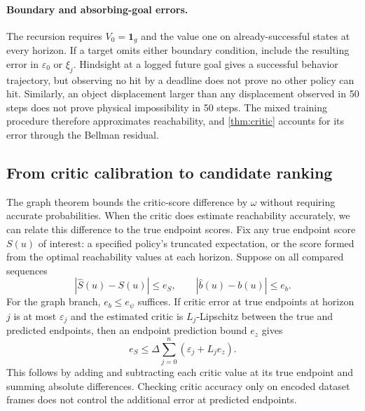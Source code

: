 \documentclass{article} %
\newcommand{\ind}{\mathbf{1}}
\theoremstyle{definition}
\theoremstyle{remark}
\begin{document}
\paragraph{Boundary and absorbing-goal errors.}
The recursion requires $V_0=\ind_g$ and the value one on already-successful states
at every horizon. If a target omits either boundary condition, include the resulting
error in $\varepsilon_0$ or $\xi_j$.
Hindsight at a logged future goal gives a successful behavior trajectory, but observing
no hit by a deadline does not prove no other policy can hit.
Similarly, an object displacement larger than any displacement observed in 50 steps
does not prove physical impossibility in 50 steps.
The mixed training procedure therefore approximates reachability, and
\cref{thm:critic} accounts for its error through the Bellman residual.

\subsection{From critic calibration to candidate ranking}
\label{app:calibration}
The graph theorem bounds the critic-score difference by $\omega$ without requiring
accurate probabilities. When the critic does estimate reachability accurately,
we can relate this difference to the true endpoint scores.
Fix any true endpoint score $S(u)$ of interest: a specified policy's truncated
expectation, or the score formed from the optimal reachability values at each horizon.
Suppose on all compared sequences
\begin{equation}
 |\widehat S(u)-S(u)|\le e_S,\qquad
 |\widehat b(u)-b(u)|\le e_b .
 \label{eq:score-uniform}
\end{equation}
For the graph branch, $e_b\le e_\psi$ suffices.
If critic error at true endpoints at horizon $j$ is at most $\varepsilon_j$ and
the estimated critic is $L_j$-Lipschitz between the true and predicted endpoints,
then an endpoint prediction bound $e_z$ gives
\begin{equation}
 e_S\le\Delta\sum_{j=0}^{n}(\varepsilon_j+L_je_z).
 \label{eq:score-model-calibration}
\end{equation}
This follows by adding and subtracting each critic value at its true
endpoint and summing absolute differences. Checking critic accuracy only on encoded
dataset frames does not control the additional error at predicted endpoints.
\end{document}
